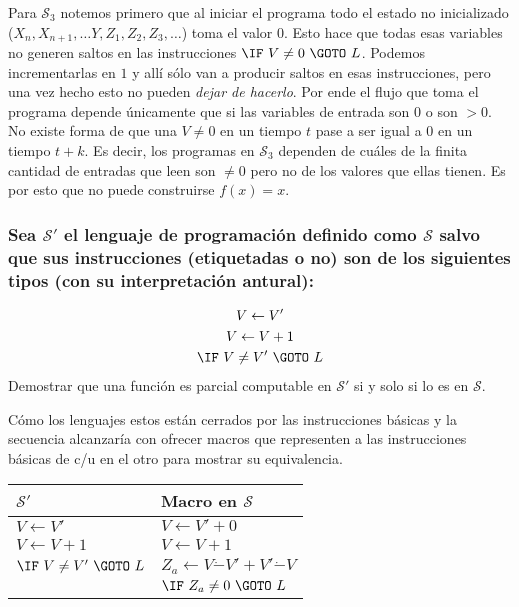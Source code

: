 \documentclass[fleqn, 11pt]{article}
\newcommand{\Scur}{\mathcal{S}}
\newcommand{\into}{\leftarrow}
\begin{document}
Para $\Scur_3$ notemos primero que al iniciar el programa todo el estado no
inicializado ($X_n, X_{n+1}, \dots Y, Z_1, Z_2, Z_3, \dots$) toma el valor 0.
Esto hace que todas esas variables no generen saltos en las instrucciones
$\IF\ V \neq 0\ \GOTO\ L$. Podemos incrementarlas en $1$ y allí sólo van a
producir saltos en esas instrucciones, pero una vez hecho esto no pueden
\emph{dejar de hacerlo}. Por ende el flujo que toma el programa depende
únicamente que si las variables de entrada son $0$ o son $> 0$. No existe forma
de que una $V \neq 0$ en un tiempo $t$ pase a ser igual a $0$ en un tiempo
$t + k$. Es decir, los programas en $\Scur_3$ dependen de cuáles de la
finita cantidad de entradas que leen son $\neq 0$ pero no de los valores que
ellas tienen. Es por esto que no puede construirse $f(x) = x$.

\subsubsection{Sea $\Scur'$ el lenguaje de programación definido como $\Scur$
salvo que sus instrucciones (etiquetadas o no) son de los siguientes tipos (con
su interpretación antural):}
\begin{gather*}
	V \into V' \\
	V \into V + 1 \\
	\IF\ V \neq V'\ \GOTO\ L
\end{gather*}
Demostrar que una función es parcial computable en $\Scur'$ si y solo si lo es
en $\Scur$.

Cómo los lenguajes estos están cerrados por las instrucciones básicas y la
secuencia alcanzaría con ofrecer macros que representen a las instrucciones
básicas de c/u en el otro para mostrar su equivalencia.

\begin{tabular}{l l}
	$\Scur'$                    & Macro en $\Scur$ \\ \toprule
	$V \into V'$                & $V \into V' + 0$ \\
	$V \into V + 1$             & $V \into V  + 1$ \\
	$\IF\ V \neq V'\ \GOTO\ L$  & $Z_a \into V \dot- V' + V' \dot- V$ \\
	                            & $\IF\ Z_a \neq 0\ \GOTO\ L$ \\
\end{tabular}
\end{document}
